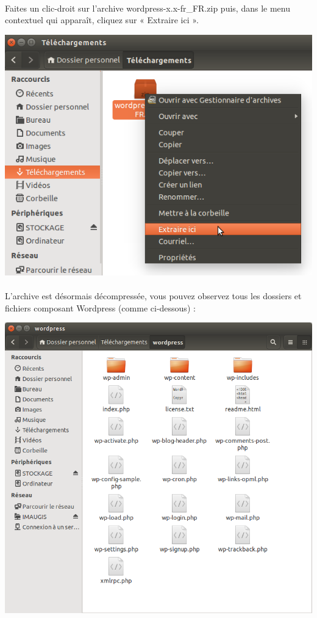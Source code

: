 \documentclass[10pt,a4paper]{article}
\begin{document}
\paragraph{}Faites un clic-droit sur l'archive wordpress-x.x-fr\_FR.zip puis, dans le menu contextuel qui apparaît, cliquez sur « Extraire ici ».
\begin{center}
\includegraphics[scale=0.5]{img/0004.png}
\end{center}
\paragraph{}L'archive est désormais décompressée, vous pouvez observez tous les dossiers et fichiers composant Wordpress (comme ci-dessous) :
\begin{center}
\includegraphics[scale=0.4]{img/0005.png}
\end{center}
\newpage
\end{document}
